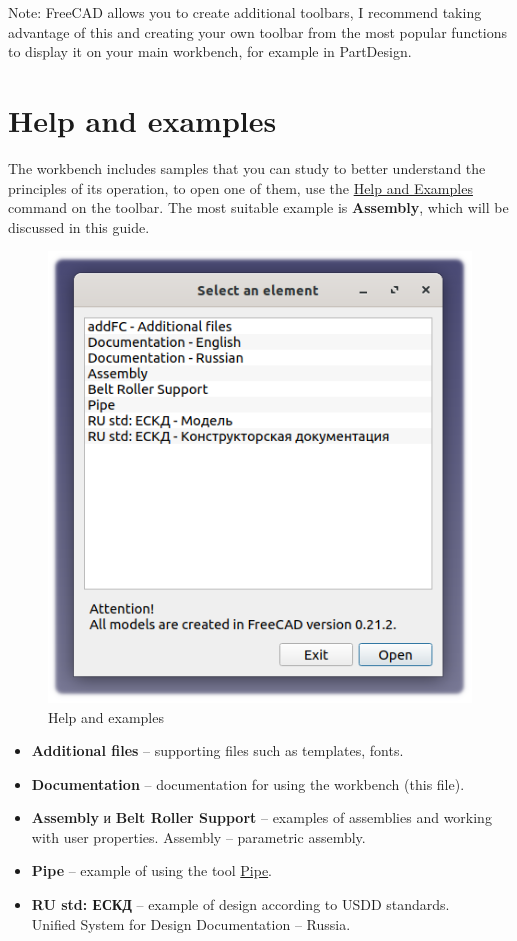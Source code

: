 \documentclass[a4paper,12pt]{article}
\begin{document}
Note: FreeCAD allows you to create additional toolbars, I recommend taking advantage of this and creating your own toolbar from the most popular functions to display it on your main workbench, for example in PartDesign.

\pagebreak




\section{Help and examples}

The workbench includes samples that you can study to better understand the principles of its operation, to open one of them, use the \hyperref[sec:10]{Help and Examples} command on the toolbar.
The most suitable example is \textbf{Assembly}, which will be discussed in this guide.

\begin{figure}[htp]
	\centering
	\includegraphics[scale=1]{img/assistant.png}
	\caption{Help and examples}
	\label{sec:assistant}
\end{figure}

\begin{itemize}
	\item \textbf{Additional files} -- supporting files such as templates, fonts.
	\item \textbf{Documentation} -- documentation for using the workbench (this file).
	\item \textbf{Assembly} и \textbf{Belt Roller Support} -- examples of assemblies and working with user properties. Assembly -- parametric assembly.
	\item \textbf{Pipe} -- example of using the tool \hyperref[sec:9]{Pipe}.
	\item \textbf{RU std: ЕСКД} -- example of design according to USDD standards.\\Unified System for Design Documentation -- Russia.
\end{itemize}
\end{document}
